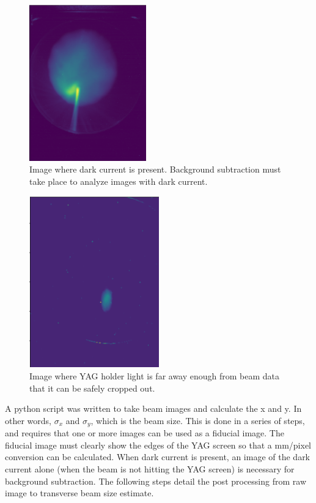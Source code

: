 \begin{figure}
	\centering
	\includegraphics[width=0.45\textwidth]{images/darkcurrent}
	\caption{Image where dark current is present. Background subtraction must take place to 
	analyze images with dark current.}
	\label{fig:darkcurrent}
\end{figure}	
\begin{figure}
	\centering
	\includegraphics[width=0.5\textwidth]{images/cleanyag}
	\caption{Image where YAG holder light is far away enough from beam data that it can be safely cropped out.}
	\label{fig:clean}
\end{figure}

A python script was written to take beam images and calculate the x and y.
In other words, $\sigma_{x}$ and $\sigma_y$, which is the beam size. 
This is done in a series of steps, and requires that one or more images can be used as a 
fiducial image. The fiducial image must clearly show the edges of the YAG screen so that a 
mm/pixel conversion can be calculated.
When dark current is present, an image of the dark current alone
(when the beam is not hitting the YAG screen) is necessary for background subtraction.
The following steps detail the post processing from raw image to transverse beam size estimate.

